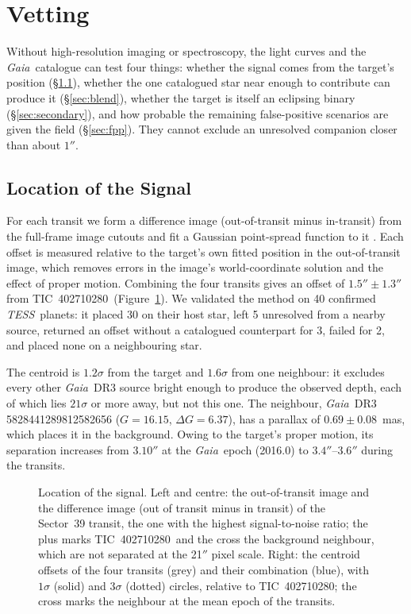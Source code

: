 \documentclass[twocolumn]{aastex631}
\newcommand{\tic}{TIC~402710280}
\newcommand{\tess}{\textit{TESS}}
\newcommand{\gaia}{\textit{Gaia}}
\begin{document}
\section{Vetting} \label{sec:vetting}

Without high-resolution imaging or spectroscopy, the light curves and the \gaia\ catalogue can test four things: whether the signal comes from the target's position (\S\ref{sec:centroid}), whether the one catalogued star near enough to contribute can produce it (\S\ref{sec:blend}), whether the target is itself an eclipsing binary (\S\ref{sec:secondary}), and how probable the remaining false-positive scenarios are given the field (\S\ref{sec:fpp}). They cannot exclude an unresolved companion closer than about $1''$.

\subsection{Location of the Signal} \label{sec:centroid}

For each transit we form a difference image (out-of-transit minus in-transit) from the full-frame image cutouts and fit a Gaussian point-spread function to it \citep[cf.][]{Bryson2013, Twicken2018}. Each offset is measured relative to the target's own fitted position in the out-of-transit image, which removes errors in the image's world-coordinate solution and the effect of proper motion. Combining the four transits gives an offset of $1.5'' \pm 1.3''$ from \tic\ (Figure~\ref{fig:diff}). We validated the method on 40 confirmed \tess\ planets: it placed 30 on their host star, left 5 unresolved from a nearby source, returned an offset without a catalogued counterpart for 3, failed for 2, and placed none on a neighbouring star.

The centroid is $1.2\sigma$ from the target and $1.6\sigma$ from one neighbour: it excludes every other \gaia\ DR3 source bright enough to produce the observed depth, each of which lies $21\sigma$ or more away, but not this one. The neighbour, \gaia\ DR3 5828441289812582656 ($G = 16.15$, $\Delta G = 6.37$), has a parallax of $0.69 \pm 0.08$~mas, which places it in the background. Owing to the target's proper motion, its separation increases from $3.10''$ at the \gaia\ epoch (2016.0) to $3.4''$--$3.6''$ during the transits.

\begin{figure}
\caption{Location of the signal. Left and centre: the out-of-transit image and the difference image (out of transit minus in transit) of the Sector~39 transit, the one with the highest signal-to-noise ratio; the plus marks \tic\ and the cross the background neighbour, which are not separated at the 21$''$ pixel scale. Right: the centroid offsets of the four transits (grey) and their combination (blue), with $1\sigma$ (solid) and $3\sigma$ (dotted) circles, relative to \tic; the cross marks the neighbour at the mean epoch of the transits.\label{fig:diff}}
\end{figure}
\end{document}
